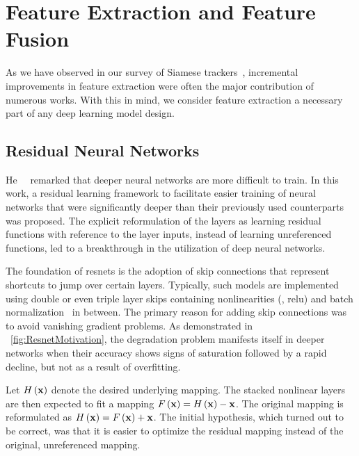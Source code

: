 \section{Feature Extraction and Feature Fusion}
\label{sec:FeatureExtractionFusion}

As we have observed in our survey of Siamese trackers~\cite{ondrasovic2021siamese}, incremental improvements in feature extraction were often the major contribution of numerous works. With this in mind, we consider feature extraction a necessary part of any deep learning model design.

\subsection{Residual Neural Networks}
\label{ssec:ResidualNeuralNetworks}

He~\etal{}~\cite{he2015resnet} remarked that deeper neural networks are more difficult to train. In this work, a residual learning framework to facilitate easier training of neural networks that were significantly deeper than their previously used counterparts was proposed. The explicit reformulation of the layers as learning residual functions with reference to the layer inputs, instead of learning unreferenced functions, led to a breakthrough in the utilization of deep neural networks.

The foundation of \glspl{resnet} is the adoption of skip connections that represent shortcuts to jump over certain layers. Typically, such models are implemented using double or even triple layer skips containing nonlinearities (\egtext{}, \gls{relu}) and batch normalization~\cite{ioffe2015batchnorm} in between. The primary reason for adding skip connections was to avoid vanishing gradient problems. As demonstrated in \figtext{}~\ref{fig:ResnetMotivation}, the degradation problem manifests itself in deeper networks when their accuracy shows signs of saturation followed by a rapid decline, but not as a result of overfitting.

Let ${H} \left( \mathbf{x} \right)$ denote the desired underlying mapping. The stacked nonlinear layers are then expected to fit a mapping ${F} \left( \mathbf{x} \right) = {H} \left( \mathbf{x} \right) - \mathbf{x}$. The original mapping is reformulated as ${H} \left( \mathbf{x} \right) = {F} \left( \mathbf{x} \right) + \mathbf{x}$. The initial hypothesis, which turned out to be correct, was that it is easier to optimize the residual mapping instead of the original, unreferenced mapping.

